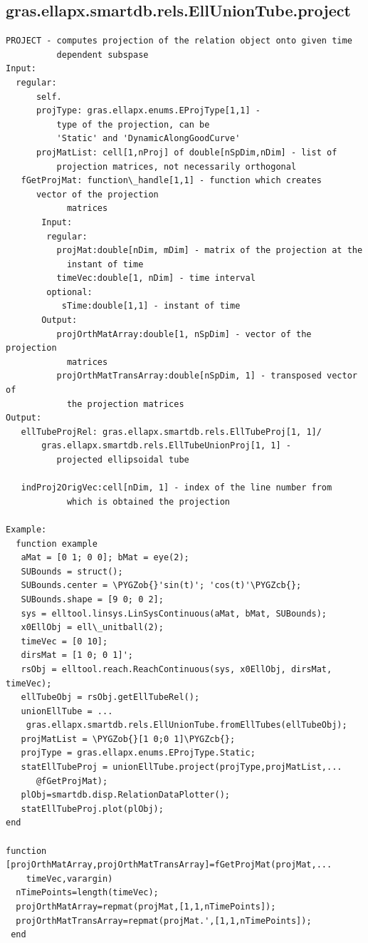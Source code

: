 \documentclass[letterpaper,10pt,english]{sphinxmanual}
\def\PYGZob{\char`\{}
\def\PYGZcb{\char`\}}
\begin{document}
\subsection{gras.ellapx.smartdb.rels.EllUnionTube.project}
\label{chap_functions:gras-ellapx-smartdb-rels-elluniontube-project}
\begin{Verbatim}[commandchars=\\\{\}]
PROJECT - computes projection of the relation object onto given time
          dependent subspase
Input:
  regular:
      self.
      projType: gras.ellapx.enums.EProjType[1,1] -
          type of the projection, can be
          'Static' and 'DynamicAlongGoodCurve'
      projMatList: cell[1,nProj] of double[nSpDim,nDim] - list of
          projection matrices, not necessarily orthogonal
   fGetProjMat: function\_handle[1,1] - function which creates
      vector of the projection
            matrices
       Input:
        regular:
          projMat:double[nDim, mDim] - matrix of the projection at the
            instant of time
          timeVec:double[1, nDim] - time interval
        optional:
           sTime:double[1,1] - instant of time
       Output:
          projOrthMatArray:double[1, nSpDim] - vector of the projection
            matrices
          projOrthMatTransArray:double[nSpDim, 1] - transposed vector of
            the projection matrices
Output:
   ellTubeProjRel: gras.ellapx.smartdb.rels.EllTubeProj[1, 1]/
       gras.ellapx.smartdb.rels.EllTubeUnionProj[1, 1] -
          projected ellipsoidal tube

   indProj2OrigVec:cell[nDim, 1] - index of the line number from
            which is obtained the projection

Example:
  function example
   aMat = [0 1; 0 0]; bMat = eye(2);
   SUBounds = struct();
   SUBounds.center = \PYGZob{}'sin(t)'; 'cos(t)'\PYGZcb{};
   SUBounds.shape = [9 0; 0 2];
   sys = elltool.linsys.LinSysContinuous(aMat, bMat, SUBounds);
   x0EllObj = ell\_unitball(2);
   timeVec = [0 10];
   dirsMat = [1 0; 0 1]';
   rsObj = elltool.reach.ReachContinuous(sys, x0EllObj, dirsMat, timeVec);
   ellTubeObj = rsObj.getEllTubeRel();
   unionEllTube = ...
    gras.ellapx.smartdb.rels.EllUnionTube.fromEllTubes(ellTubeObj);
   projMatList = \PYGZob{}[1 0;0 1]\PYGZcb{};
   projType = gras.ellapx.enums.EProjType.Static;
   statEllTubeProj = unionEllTube.project(projType,projMatList,...
      @fGetProjMat);
   plObj=smartdb.disp.RelationDataPlotter();
   statEllTubeProj.plot(plObj);
end

function [projOrthMatArray,projOrthMatTransArray]=fGetProjMat(projMat,...
    timeVec,varargin)
  nTimePoints=length(timeVec);
  projOrthMatArray=repmat(projMat,[1,1,nTimePoints]);
  projOrthMatTransArray=repmat(projMat.',[1,1,nTimePoints]);
 end
\end{Verbatim}
\end{document}
